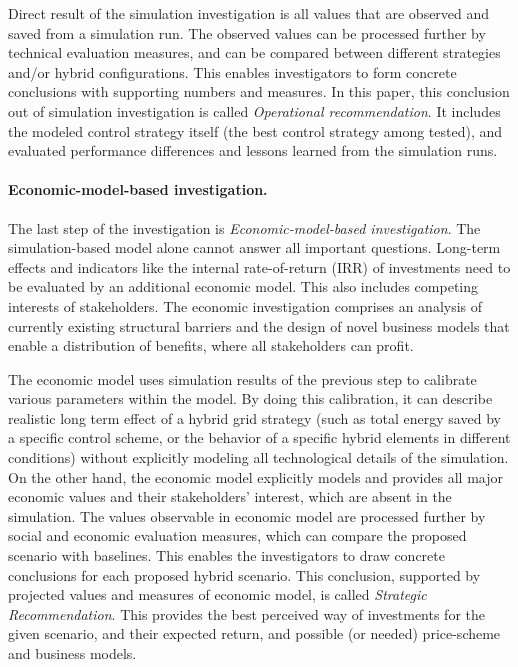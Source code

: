 \documentclass[a4paper,twoside]{article}
\begin{document}
Direct result of the simulation investigation is all values that 
are observed and saved from a simulation run. The observed values can
be processed further by technical evaluation measures, and can be
compared between different strategies and/or hybrid configurations. 
This enables investigators to form concrete conclusions with
supporting numbers and measures. In this paper, this conclusion out of
simulation investigation is called {\em Operational recommendation}. 
It includes the modeled control strategy itself (the best control
strategy among tested), and evaluated performance differences and
lessons learned from the simulation runs. 

\paragraph{Economic-model-based investigation.}
\noindent
The last step of the investigation is {\em Economic-model-based 
  investigation}. 
The simulation-based model alone cannot answer all important
questions. Long-term effects and indicators like the internal
rate-of-return (IRR) of investments need to be evaluated by an
additional economic model.   
This also includes competing interests of stakeholders. 
The economic investigation comprises an analysis of currently existing
structural barriers and the design of novel business models that
enable a distribution of benefits, where all stakeholders can profit.  

The economic model uses simulation results of the previous step
to calibrate various parameters within the model. 
By doing this calibration, it can describe realistic long term effect
of a hybrid grid strategy (such as total energy saved by a specific
control scheme, or the behavior of a specific hybrid elements in
different conditions) without explicitly modeling all technological
details of the simulation. 
On the other hand, the economic model explicitly models and provides
all major economic values and their stakeholders' interest, which are  
absent in the simulation. The values observable in economic model are
processed further by social and economic evaluation measures, which
can compare the proposed scenario with baselines. 
This enables the investigators to draw concrete conclusions for each 
proposed hybrid scenario. This conclusion, supported by projected
values and measures of economic model, is called {\em Strategic
Recommendation}. 
This provides the best perceived way of investments for the given
scenario, and their expected return, and possible (or needed)
price-scheme and business models.    
\end{document}
